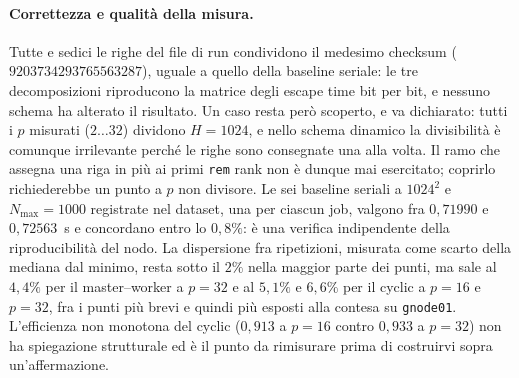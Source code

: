 \paragraph{Correttezza e qualità della misura.}
Tutte e sedici le righe del file di run condividono il medesimo checksum
($9203734293765563287$), uguale a quello della baseline seriale: le tre
decomposizioni riproducono la matrice degli escape time bit per bit, e nessuno
schema ha alterato il risultato. Un caso resta però scoperto, e va dichiarato:
tutti i $p$ misurati ($2 \ldots 32$) dividono $H = 1024$, e nello schema dinamico
la divisibilità è comunque irrilevante perché le righe sono consegnate una alla
volta. Il ramo che assegna una riga in più ai primi \texttt{rem} rank non è
dunque mai esercitato; coprirlo richiederebbe un punto a $p$ non divisore. Le sei baseline seriali a $1024^2$ e $N_{\max}=1000$ registrate nel
dataset, una per ciascun job, valgono fra $0{,}71990$ e $0{,}72563$~s e
concordano entro lo $0{,}8\%$: è una verifica indipendente della riproducibilità
del nodo. La dispersione fra ripetizioni, misurata come scarto della mediana dal
minimo, resta sotto il $2\%$ nella maggior parte dei punti, ma sale al $4{,}4\%$
per il master--worker a $p=32$ e al $5{,}1\%$ e $6{,}6\%$ per il cyclic a $p=16$
e $p=32$, fra i punti più brevi e quindi più esposti alla contesa su
\texttt{gnode01}. L'efficienza non monotona del cyclic ($0{,}913$ a $p=16$
contro $0{,}933$ a $p=32$) non ha spiegazione strutturale ed è il punto da
rimisurare prima di costruirvi sopra un'affermazione.